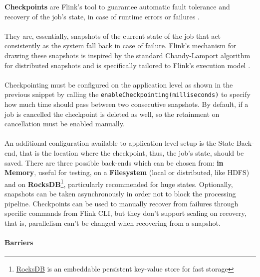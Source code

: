 \textbf{Checkpoints} are Flink's tool to guarantee automatic fault tolerance and recovery of the job's state, in case of runtime errors or failures \cite{flink_checkpointing}. 
\\
\\
They are, essentially, snapshots of the current state of the job that act consistently as the system fall back in case of failure. Flink’s mechanism for drawing these snapshots is inspired by the standard Chandy-Lamport algorithm \cite{Chandy:1985:DSD:214451.214456} for distributed snapshots and is specifically tailored to Flink’s execution model \cite{DBLP:journals/corr/CarboneFEHT15}. 
\\
\\
Checkpointing must be configured on the application level as shown in the previous snippet by calling the \texttt{enableCheckpointing(milliseconds)} to specify how much time should pass between two consecutive snapshots. By default, if a job is cancelled the checkpoint is deleted as well, so the retainment on cancellation must be enabled manually. 
\\
\\
An additional configuration available to application level setup is the State Back-end, that is the location where the checkpoint, thus, the job's state, should be saved. There are three possible back-ends which can be chosen from: \textbf{in Memory}, useful for testing, on a \textbf{Filesystem} (local or distributed, like HDFS) and on \textbf{RocksDB}\footnote{\href{http://rocksdb.org/}{RocksDB} is an embeddable persistent key-value store for fast storage}, particularly recommended for huge states. Optionally, snapshots can be taken asynchronously in order not to block the processing pipeline.
Checkpoints can be used to manually recover from failures through specific commands from Flink CLI, but they don't support scaling on recovery, that is, parallelism can't be changed when recovering from a snapshot.

\paragraph{Barriers}

